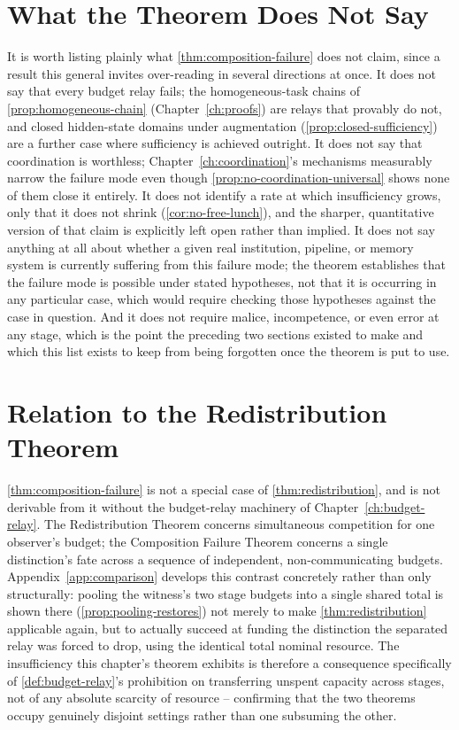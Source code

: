 \section{What the Theorem Does Not Say}

It is worth listing plainly what \cref{thm:composition-failure} does not
claim, since a result this general invites over-reading in several
directions at once. It does not say that every budget relay fails; the
homogeneous-task chains of \cref{prop:homogeneous-chain}
(Chapter~\ref{ch:proofs}) are relays that provably do not, and closed
hidden-state domains under augmentation (\cref{prop:closed-sufficiency})
are a further case where sufficiency is achieved outright. It does not
say that coordination is worthless; Chapter~\ref{ch:coordination}'s
mechanisms measurably narrow the failure mode even though
\cref{prop:no-coordination-universal} shows none of them close it
entirely. It does not identify a rate at which insufficiency grows,
only that it does not shrink (\cref{cor:no-free-lunch}), and the
sharper, quantitative version of that claim is explicitly left open
rather than implied. It does not say anything at all about whether a
given real institution, pipeline, or memory system is currently
suffering from this failure mode; the theorem establishes that the
failure mode is possible under stated hypotheses, not that it is
occurring in any particular case, which would require checking those
hypotheses against the case in question. And it does not require malice,
incompetence, or even error at any stage, which is the point the
preceding two sections existed to make and which this list exists to
keep from being forgotten once the theorem is put to use.

\section{Relation to the Redistribution Theorem}

\cref{thm:composition-failure} is not a special case of
\cref{thm:redistribution}, and is not derivable from it without the
budget-relay machinery of Chapter~\ref{ch:budget-relay}. The
Redistribution Theorem concerns simultaneous competition for one
observer's budget; the Composition Failure Theorem concerns a single
distinction's fate across a sequence of independent, non-communicating
budgets. Appendix~\ref{app:comparison} develops this contrast concretely
rather than only structurally: pooling the witness's two stage budgets
into a single shared total is shown there
(\cref{prop:pooling-restores}) not merely to make
\cref{thm:redistribution} applicable again, but to actually succeed at
funding the distinction the separated relay was forced to drop, using
the identical total nominal resource. The insufficiency this chapter's
theorem exhibits is therefore a consequence specifically of
\cref{def:budget-relay}'s prohibition on transferring unspent capacity
across stages, not of any absolute scarcity of resource -- confirming
that the two theorems occupy genuinely disjoint settings rather than one
subsuming the other.
